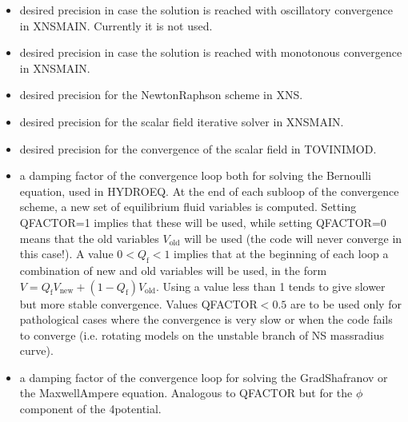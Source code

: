 \documentclass[letterpaper,10pt,english]{sphinxmanual}
\begin{document}
\begin{itemize}
\item {} 
\sphinxAtStartPar
{} \sphinxhyphen{} desired precision in case the solution is reached with oscillatory convergence in XNSMAIN. Currently it is not used.


\item {} 
\sphinxAtStartPar
{} \sphinxhyphen{} desired precision in case the solution is reached with monotonous convergence in XNSMAIN.


\item {} 
\sphinxAtStartPar
{} \sphinxhyphen{} desired precision for the Newton\sphinxhyphen{}Raphson scheme in XNS.


\item {} 
\sphinxAtStartPar
{} \sphinxhyphen{} desired precision for the scalar field iterative solver in XNSMAIN.


\item {} 
\sphinxAtStartPar
{} \sphinxhyphen{} desired precision for the convergence of the scalar field in TOVINIMOD.


\item {} 
\sphinxAtStartPar
{} \sphinxhyphen{} a damping factor of the convergence loop both for solving the Bernoulli equation, used in HYDROEQ.
At the end of each sub\sphinxhyphen{}loop of the convergence scheme, a new set of equilibrium fluid variables is
computed. Setting QFACTOR=1 implies that these will be used, while setting QFACTOR=0 means that
the old variables \(V_\mathrm{old}\) will be used (the code will never converge in this case!). A value \(0 < Q_\mathrm{f} < 1\)
implies that at the beginning of each loop a combination of new and old variables will be used, in the
form \(V = Q_\mathrm{f}V_\mathrm{new} + (1 − Q_\mathrm{f})V_\mathrm{old}\).
Using a value less than 1 tends to give slower but more stable convergence. Values QFACTOR\( < 0.5\)
are to be used only for pathological cases where the convergence is very slow or when the code fails
to converge (i.e. rotating models on the unstable branch of NS mass\sphinxhyphen{}radius curve).


\item {} 
\sphinxAtStartPar
{} \sphinxhyphen{} a damping factor of the convergence loop for solving the Grad\sphinxhyphen{}Shafranov or the Maxwell\sphinxhyphen{}Ampere equation. Analogous to QFACTOR but for the \(\phi\)\sphinxhyphen{}component of the 4\sphinxhyphen{}potential.



\end{itemize}
\end{document}
